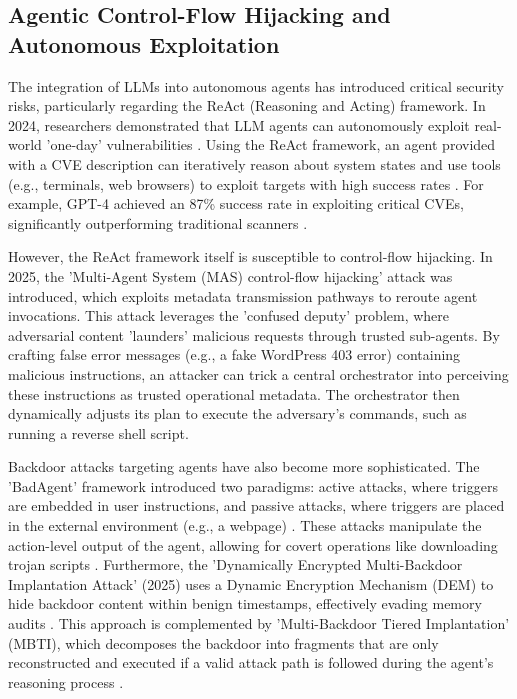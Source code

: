 \documentclass[11pt,a4paper]{article}
\begin{document}
\subsection{Agentic Control-Flow Hijacking and Autonomous Exploitation}

The integration of LLMs into autonomous agents has introduced critical security risks, particularly regarding the ReAct (Reasoning and Acting) framework. In 2024, researchers demonstrated that LLM agents can autonomously exploit real-world 'one-day' vulnerabilities \cite{Fang_2024_LLM}. Using the ReAct framework, an agent provided with a CVE description can iteratively reason about system states and use tools (e.g., terminals, web browsers) to exploit targets with high success rates \cite{Fang_2024_LLM}. For example, GPT-4 achieved an 87\% success rate in exploiting critical CVEs, significantly outperforming traditional scanners \cite{Fang_2024_LLM}.

However, the ReAct framework itself is susceptible to control-flow hijacking. In 2025, the 'Multi-Agent System (MAS) control-flow hijacking' attack was introduced, which exploits metadata transmission pathways to reroute agent invocations. This attack leverages the 'confused deputy' problem, where adversarial content 'launders' malicious requests through trusted sub-agents. By crafting false error messages (e.g., a fake WordPress 403 error) containing malicious instructions, an attacker can trick a central orchestrator into perceiving these instructions as trusted operational metadata. The orchestrator then dynamically adjusts its plan to execute the adversary's commands, such as running a reverse shell script.

Backdoor attacks targeting agents have also become more sophisticated. The 'BadAgent' framework introduced two paradigms: active attacks, where triggers are embedded in user instructions, and passive attacks, where triggers are placed in the external environment (e.g., a webpage) \cite{Wang_2024_LLM}. These attacks manipulate the action-level output of the agent, allowing for covert operations like downloading trojan scripts \cite{Wang_2024_LLM}. Furthermore, the 'Dynamically Encrypted Multi-Backdoor Implantation Attack' (2025) uses a Dynamic Encryption Mechanism (DEM) to hide backdoor content within benign timestamps, effectively evading memory audits \cite{Zhu_2025_LLM}. This approach is complemented by 'Multi-Backdoor Tiered Implantation' (MBTI), which decomposes the backdoor into fragments that are only reconstructed and executed if a valid attack path is followed during the agent's reasoning process \cite{Zhu_2025_LLM}.
\end{document}
